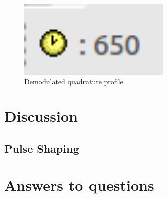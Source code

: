 \documentclass{article}
\begin{document}
\begin{figure}[h]
  \begin{center}
    \includegraphics[width=0.65\textwidth]{img/task_2_c_profile.png}
    \caption{Demodulated quadrature profile.}
  \end{center}
\end{figure}

\pagebreak


\section{Discussion}

\subsection{Pulse Shaping}



\section{Answers to questions}
\end{document}
